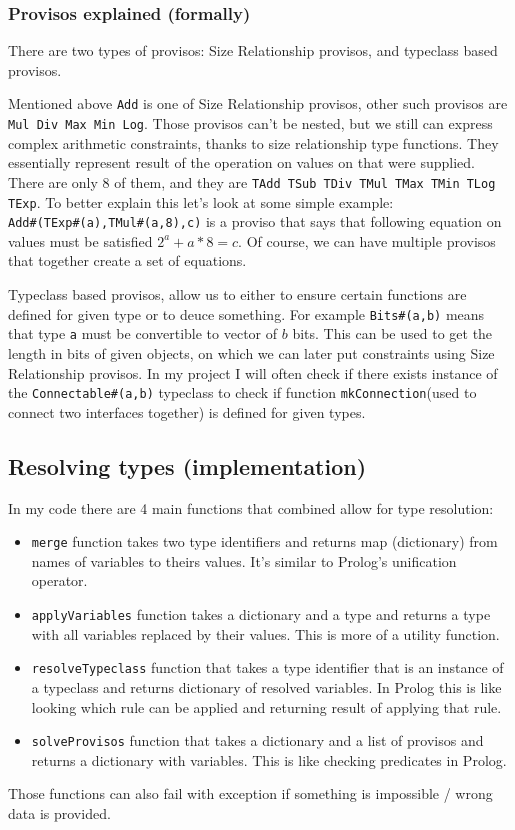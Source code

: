 \documentclass[14pt]{report}
\begin{document}
\subsubsection{Provisos explained (formally)}
There are two types of provisos: Size Relationship provisos, and typeclass based provisos.

Mentioned above \verb!Add! is one of Size Relationship provisos, other such provisos are \verb!Mul Div Max Min Log!. Those provisos can't be nested, but we still can express complex arithmetic constraints, thanks to size relationship type functions. They essentially represent result of the operation on values on that were supplied. There are only 8 of them, and they are \verb!TAdd TSub TDiv TMul TMax TMin TLog TExp!.
To better explain this let's look at some simple example: \\
\verb!Add#(TExp#(a),TMul#(a,8),c)! is a proviso that says that following equation on values must be satisfied $2^a+a*8 = c$.
Of course, we can have multiple provisos that together create a set of equations. 

Typeclass based provisos, allow us to either to ensure certain functions are defined for given type or to deuce something. For example \verb!Bits#(a,b)! means that type \verb!a! must be convertible to vector of $b$ bits. This can be used to get the length in bits of given objects, on which we can later put constraints using Size Relationship provisos.
In my project I will often check if there exists instance of the \verb!Connectable#(a,b)! typeclass to check if function \verb!mkConnection!(used to connect two interfaces together) is defined for given types.

\subsection{Resolving types (implementation)}
In my code there are 4 main functions that combined allow for type resolution:
\begin{itemize}
    \item \verb!merge! function takes two type identifiers and returns map (dictionary) from names of variables to theirs values. It's similar to Prolog's unification operator.
    \item \verb!applyVariables! function takes a dictionary and a type and returns a type with all variables replaced by their values. This is more of a utility function.
    \item \verb!resolveTypeclass! function that takes a type identifier that is an instance of a typeclass and returns dictionary of resolved variables. In Prolog this is like looking which rule can be applied and returning result of applying that rule.
    \item \verb!solveProvisos! function that takes a dictionary and a list of provisos and returns a dictionary with variables. This is like checking predicates in Prolog.
\end{itemize}
Those functions can also fail with exception if something is impossible / wrong data is provided.
\end{document}
